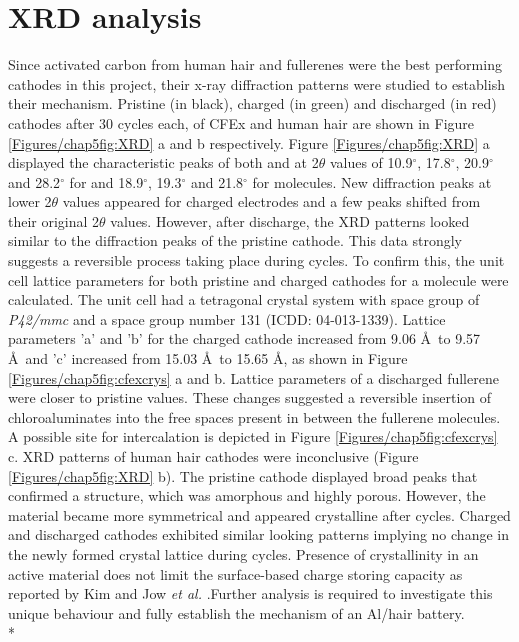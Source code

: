 \section*{XRD analysis}
Since activated carbon from human hair and fullerenes were the best performing cathodes in this project, their x-ray diffraction patterns were studied to establish their mechanism. Pristine (in black), charged (in green) and discharged (in red) cathodes after 30 cycles each, of CFEx and human hair are shown in Figure \ref{Figures/chap5fig:XRD} a and b respectively. Figure \ref{Figures/chap5fig:XRD} a displayed the characteristic peaks of both  and  at 2$\theta$ values of 10.9$^{\circ}$, 17.8$^{\circ}$, 20.9$^{\circ}$ and 28.2$^{\circ}$ for  and 18.9$^{\circ}$, 19.3$^{\circ}$ and 21.8$^{\circ}$ for  molecules. New diffraction peaks at lower 2$\theta$ values appeared for charged electrodes and a few peaks shifted from their original 2$\theta$ values. However, after discharge, the XRD patterns looked similar to the diffraction peaks of the pristine cathode. This data strongly suggests a reversible process taking place during cycles. To confirm this, the unit cell lattice parameters for both pristine and charged cathodes for a  molecule were calculated. The unit cell had a tetragonal crystal system with space group of \textit{P42/mmc} and a space group number 131 (ICDD: 04-013-1339). Lattice parameters 'a' and 'b' for the charged cathode increased from 9.06 \AA\ to 9.57 \AA\ and 'c' increased from 15.03 \AA\ to 15.65 \AA, as shown in Figure \ref{Figures/chap5fig:cfexcrys} a and b. Lattice parameters of a discharged fullerene were closer to pristine values. These changes suggested a reversible insertion of chloroaluminates into the free spaces present in between the fullerene molecules. A possible site for  intercalation is depicted in Figure \ref{Figures/chap5fig:cfexcrys} c. XRD patterns of human hair cathodes were inconclusive (Figure \ref{Figures/chap5fig:XRD} b). The pristine cathode displayed broad peaks that confirmed a structure, which was amorphous and highly porous. However, the material became more symmetrical and appeared crystalline after cycles. Charged and discharged cathodes exhibited similar looking patterns implying no change in the newly formed crystal lattice during cycles. Presence of crystallinity in an active material does not limit the surface-based charge storing capacity as reported by Kim and Jow \textit{et al.} \cite{kim_synthesis_2006, jow_factors_2018}.Further analysis is required to investigate this unique behaviour and fully establish the mechanism of an Al/hair battery.\\*

